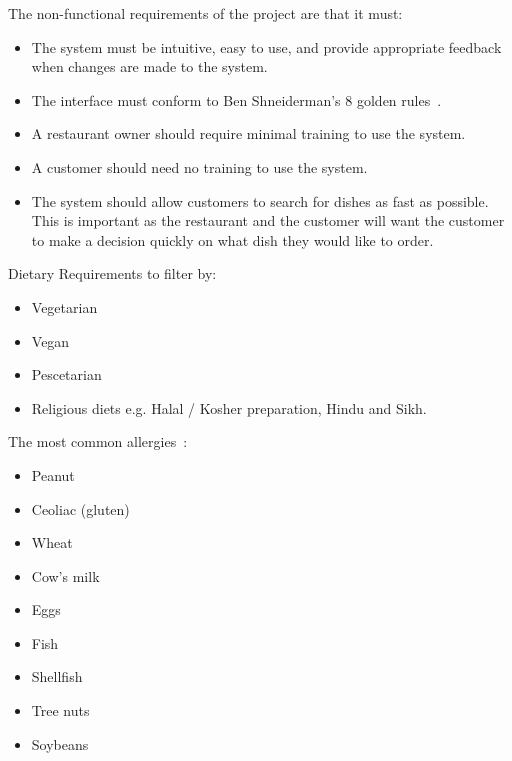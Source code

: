 The non-functional requirements of the project are that it must:

\begin{itemize}
\item The system must be intuitive, easy to use, and provide appropriate feedback when changes are made to the system.
\item The interface must conform to Ben Shneiderman's 8 golden rules~\cite{shneiderman}.
\item A restaurant owner should require minimal training to use the system.
\item A customer should need no training to use the system.
\item The system should allow customers to search for dishes as fast as possible. This is important as the restaurant and the customer will want the customer to make a decision quickly on what dish they would like to order.
\end{itemize}

\newpage

Dietary Requirements to filter by:

\begin{itemize}
\item Vegetarian
\item Vegan
\item Pescetarian
\item Religious diets e.g. Halal / Kosher preparation, Hindu and Sikh.
\end{itemize}

The most common allergies~\cite{burks2001food}:

\begin{itemize}
\item Peanut
\item Ceoliac (gluten)
\item Wheat
\item Cow's milk
\item Eggs
\item Fish
\item Shellfish
\item Tree nuts
\item Soybeans
\end{itemize}

